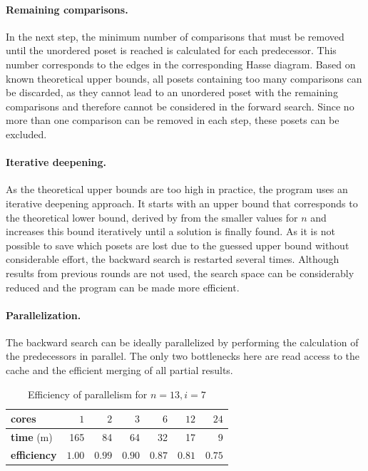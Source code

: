 \documentclass[twoside,leqno,twocolumn]{article}
\begin{document}
\paragraph{Remaining comparisons.}
In the next step, the minimum number of comparisons that must be removed until the unordered poset is reached is calculated for each predecessor.
This number corresponds to the edges in the corresponding Hasse diagram.
Based on known theoretical upper bounds, all posets containing too many comparisons can be discarded, as they cannot lead to an unordered poset with the remaining comparisons and therefore cannot be considered in the forward search.
Since no more than one comparison can be removed in each step, these posets can be excluded.

\paragraph{Iterative deepening.}
As the theoretical upper bounds are too high in practice, the program uses an iterative deepening approach.
It starts with an upper bound that corresponds to the theoretical lower bound, derived by  from the smaller values for $n$ and increases this bound iteratively until a solution is finally found.
As it is not possible to save which posets are lost due to the guessed upper bound without considerable effort, the backward search is restarted several times.
Although results from previous rounds are not used, the search space can be considerably reduced and the program can be made more efficient.

\paragraph{Parallelization.} \label{sec:backward:parallelisation}
The backward search can be ideally parallelized by performing the calculation of the predecessors in parallel.
The only two bottlenecks here are read access to the cache and the efficient merging of all partial results.

\begin{table}[!t]
  \renewcommand{\arraystretch}{1.1}
  \caption{Efficiency of parallelism for $n = 13, i = 7$}
  \label{table:backward-parallel}
  \centering
  \small
  \begin{tabular}{l|rrrrrr}
    \textbf{cores}      & $1$    & $2$    & $3$    & $6$    & $12$   & $24$   \\ \hline
    \textbf{time} (m)   & 165    & 84     & 64     & 32     & 17     & 9      \\ \hline
    \textbf{efficiency} & $1.00$ & $0.99$ & $0.90$ & $0.87$ & $0.81$ & $0.75$
  \end{tabular}
\end{table}
\end{document}
